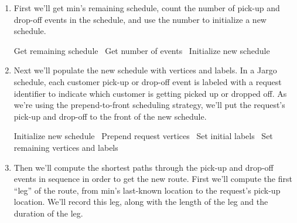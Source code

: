 \begin{enumerate}

\item First we'll get {\Tt{}min\nwendquote}'s remaining schedule, count the number of
pick-up and drop-off events in the schedule, and use the number to initialize
a new schedule.

\nwenddocs{}\plusendmoddef\nwstartdeflinemarkup{}\nwenddeflinemarkup
  \LA{}Get remaining schedule~{\nwtagstyle{}}\RA{}
  \LA{}Get number of events~{\nwtagstyle{}}\RA{}
  \LA{}Initialize new schedule~{\nwtagstyle{}}\RA{}
\nwendcode{}%
%
\item Next we'll populate the new schedule with vertices and labels. In a Jargo
schedule, each customer pick-up or drop-off event is labeled with a request
identifier to indicate which customer is getting picked up or dropped off.
As we're using the prepend-to-front scheduling strategy, we'll
put the request's pick-up and drop-off to the front of the new schedule.

\nwenddocs{}\plusendmoddef\nwstartdeflinemarkup{}\nwenddeflinemarkup
  \LA{}Initialize new schedule~{\nwtagstyle{}}\RA{}
  \LA{}Prepend request vertices~{\nwtagstyle{}}\RA{}
  \LA{}Set initial labels~{\nwtagstyle{}}\RA{}
  \LA{}Set remaining vertices and labels~{\nwtagstyle{}}\RA{}
\nwendcode{}%
%
\item Then we'll compute the shortest paths through the pick-up and drop-off
events in sequence in order to get the new route. First we'll compute the first
``leg'' of the route, from {\Tt{}min\nwendquote}'s last-known location to the request's
pick-up location. We'll record this leg, along with the length of the leg and
the duration of the leg.


\end{enumerate}
